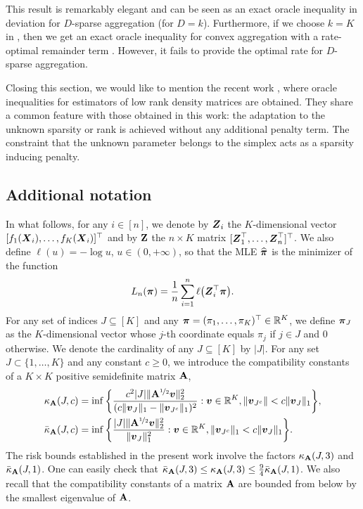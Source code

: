This result is remarkably elegant and can be seen as an exact oracle inequality in deviation for $D$-sparse aggregation (for $D=k$).
Furthermore, if we choose $k=K$ in , then we get an exact oracle inequality for convex aggregation with a
rate-optimal remainder term  \citep{Tsybakov03}. However, it fails to provide the optimal rate for $D$-sparse aggregation.

Closing this section, we would like to mention the recent work \citep{Xia16}, where oracle inequalities for estimators of low rank
density matrices are obtained. They share a common feature with those obtained in this work: the adaptation to the unknown sparsity
or rank is achieved without any additional penalty term. The constraint that the unknown parameter belongs to the simplex acts
as a sparsity inducing penalty.

\subsection{Additional notation}

In what follows, for any $i\in [n]$, we denote by $\boldsymbol Z_i$ the $K$-dimensional vector $[f_1(\boldsymbol X_i),\ldots,f_K(\boldsymbol X_i)]^\top$ and
by $\mathbf Z$ the $n\times K$ matrix  $[\boldsymbol Z^\top_1,\ldots,\boldsymbol Z^\top_n]^\top$. We also define $\ell(u) = -\log u$,
$u\in(0,+\infty)$,
so that the MLE $\widehat{\boldsymbol \pi}$ is the minimizer of the function
\begin{equation}
\label{Phi}
L_n(\boldsymbol \pi) = \frac1n\sum_{i=1}^n \ell\big(\boldsymbol Z_i^\top\boldsymbol \pi\big).
\end{equation}
For any set of indices $J\subseteq [K]$ and any $\boldsymbol \pi=(\pi_1,\dots,\pi_K)^{\top}\in{\mathbb R}^K$,
we define $\boldsymbol \pi_J$ as the $K$-dimensional vector whose $j$-th coordinate equals $\pi_j$ if $j\in J$ and $0$ otherwise.
We denote the cardinality of any $J\subseteq[K]$ by $\vert J\vert$. For any set $J\subset \{1, \dots, K\}$ and any
constant $c\geq 0$, we introduce the compatibility constants \citep{VandeGeerConditionLasso09}
of a $K\times K$ positive semidefinite matrix $\mathbf A$,
\begin{align}
\kappa_{\mathbf A}(J,c) &= \inf\bigg\{ \frac{c^2|J|\|\mathbf A^{\nicefrac12}\boldsymbol v \|_2^2}{(c\|\boldsymbol v_J\|_1-\|\boldsymbol v_{J^c}\|_1)^2} :
\boldsymbol v\in{\mathbb R}^K,\|\boldsymbol v_{J^c}\|< c\|\boldsymbol v_J\|_1\bigg\},\\
\bar\kappa_\mathbf A(J,c) &=\inf\bigg\{\frac{|J|\|\mathbf A^{\nicefrac12}\boldsymbol v\|_2^{2}}{\Vert \boldsymbol v_{J}\Vert^{2}_{1}}:
\boldsymbol v\in{\mathbb R}^{K},\Vert \boldsymbol v_{J^{c}}\Vert_{1}<c\Vert \boldsymbol v_{J}\Vert_{1}\bigg\}.
\end{align}
The risk bounds established in the present work involve the factors $\kappa_{\mathbf A}(J,3)$ and
$\bar\kappa_{\mathbf A}(J,1)$. One can easily check that $\bar\kappa_{\mathbf A}(J,3)\le \kappa_{\mathbf A}(J,3)
\le \frac94 \bar\kappa_{\mathbf A}(J,1)$. We also recall that the compatibility constants of a matrix
$\mathbf A$ are bounded  from below by the smallest eigenvalue of $\mathbf A$.

